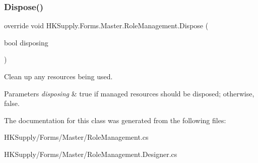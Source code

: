 \subsubsection{\texorpdfstring{Dispose()}{Dispose()}}
{\footnotesize\ttfamily override void H\+K\+Supply.\+Forms.\+Master.\+Role\+Management.\+Dispose (\begin{DoxyParamCaption}\item[{bool}]{disposing }\end{DoxyParamCaption})\hspace{0.3cm}{\ttfamily [protected]}}



Clean up any resources being used. 


\begin{DoxyParams}{Parameters}
{\em disposing} & true if managed resources should be disposed; otherwise, false.\\
\hline
\end{DoxyParams}


The documentation for this class was generated from the following files\+:\begin{DoxyCompactItemize}
\item 
H\+K\+Supply/\+Forms/\+Master/Role\+Management.\+cs\item 
H\+K\+Supply/\+Forms/\+Master/Role\+Management.\+Designer.\+cs\end{DoxyCompactItemize}
